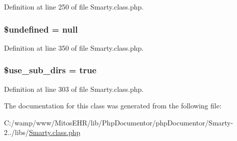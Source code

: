 \-Definition at line 250 of file \-Smarty.\-class.\-php.

\hypertarget{class_smarty_a7b9e122920a6696307fca34a3e041a9a}{
\subsubsection[{\$undefined}]{\setlength{\rightskip}{0pt plus 5cm}\$undefined = null}}\label{class_smarty_a7b9e122920a6696307fca34a3e041a9a}


\-Definition at line 350 of file \-Smarty.\-class.\-php.

\hypertarget{class_smarty_a9d2c3aa18168752d2a32b5aac08b25cd}{
\subsubsection[{\$use\-\_\-sub\-\_\-dirs}]{\setlength{\rightskip}{0pt plus 5cm}\$use\-\_\-sub\-\_\-dirs = true}}\label{class_smarty_a9d2c3aa18168752d2a32b5aac08b25cd}


\-Definition at line 303 of file \-Smarty.\-class.\-php.



\-The documentation for this class was generated from the following file\-:\begin{DoxyCompactItemize}
\item 
\-C\-:/wamp/www/\-Mitos\-E\-H\-R/lib/\-Php\-Documentor/php\-Documentor/\-Smarty-\/2../libs/\hyperlink{_smarty_8class_8php}{\-Smarty.\-class.\-php}\end{DoxyCompactItemize}
